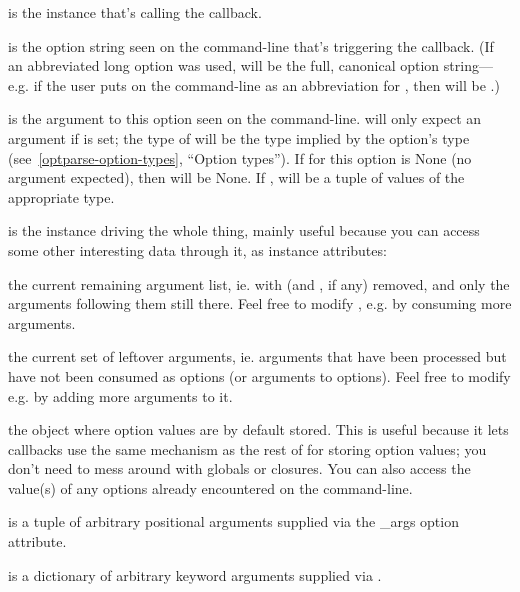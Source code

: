 \begin{definitions}
is the  instance that's calling the callback.

is the option string seen on the command-line that's triggering the
callback.  (If an abbreviated long option was used,  will be
the full, canonical option string---e.g. if the user puts
 on the command-line as an abbreviation for
, then  will be
.)

is the argument to this option seen on the command-line.
 will only expect an argument if  is
set; the type of  will be the type implied by the
option's type (see~\ref{optparse-option-types}, ``Option types'').  If
 for this option is None (no argument expected), then
 will be None.  If ,  will
be a tuple of values of the appropriate type.

is the  instance driving the whole thing, mainly
useful because you can access some other interesting data through it,
as instance attributes:

\begin{definitions}
the current remaining argument list, ie. with  (and
, if any) removed, and only the arguments following
them still there.  Feel free to modify ,
e.g. by consuming more arguments.
    
the current set of leftover arguments, ie. arguments that have been
processed but have not been consumed as options (or arguments to
options).  Feel free to modify  e.g. by adding
more arguments to it.
    
the object where option values are by default stored.  This is useful
because it lets callbacks use the same mechanism as the rest of
 for storing option values; you don't need to mess
around with globals or closures.  You can also access the value(s) of
any options already encountered on the command-line.
\end{definitions}

is a tuple of arbitrary positional arguments supplied via the
_args option attribute.

is a dictionary of arbitrary keyword arguments supplied via
.
\end{definitions}

